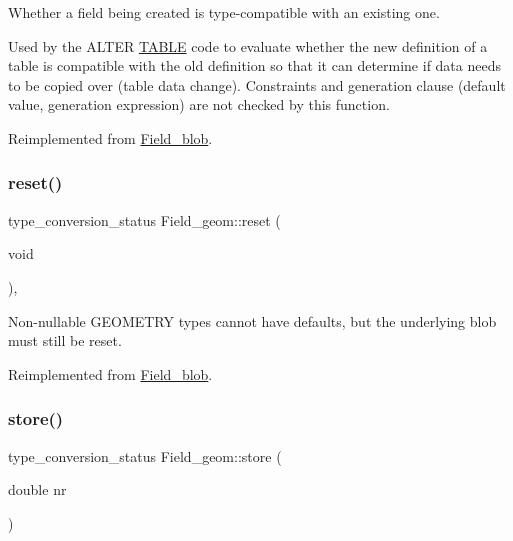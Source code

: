 Whether a field being created is type-\/compatible with an existing one.

Used by the A\+L\+T\+ER \mbox{\hyperlink{structTABLE}{T\+A\+B\+LE}} code to evaluate whether the new definition of a table is compatible with the old definition so that it can determine if data needs to be copied over (table data change). Constraints and generation clause (default value, generation expression) are not checked by this function. 

Reimplemented from \mbox{\hyperlink{classField__blob_aad2a7c5fe21d9c7cfd20aeea52c58ed5}{Field\+\_\+blob}}.

\mbox{\label{classField__geom_a029dfebc6f8ceb3b00f74be7c191a7d4}} 
\subsubsection{\texorpdfstring{reset()}{reset()}}
{\footnotesize\ttfamily type\+\_\+conversion\+\_\+status Field\+\_\+geom\+::reset (\begin{DoxyParamCaption}\item[{void}]{ }\end{DoxyParamCaption})\hspace{0.3cm}{\ttfamily [inline]}, {\ttfamily [virtual]}}

Non-\/nullable G\+E\+O\+M\+E\+T\+RY types cannot have defaults, but the underlying blob must still be reset. 

Reimplemented from \mbox{\hyperlink{classField__blob}{Field\+\_\+blob}}.

\mbox{\label{classField__geom_aa150c79e0569c74ed2a004ddab0dc6f1}} 
\subsubsection{\texorpdfstring{store()}{store()}}
{\footnotesize\ttfamily type\+\_\+conversion\+\_\+status Field\+\_\+geom\+::store (\begin{DoxyParamCaption}\item[{double}]{nr }\end{DoxyParamCaption})\hspace{0.3cm}{\ttfamily [virtual]}}

